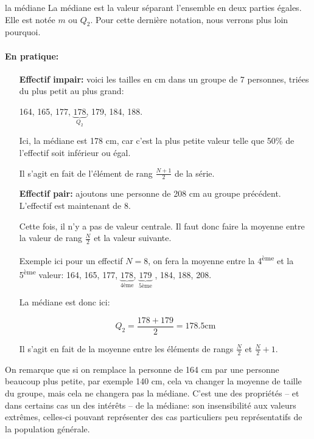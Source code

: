 \documentclass[a4paper,12pt]{scrartcl}
\begin{document}
\begin{definition}{la médiane}
La médiane est la valeur séparant l'ensemble en deux parties égales. Elle est notée $m$ ou $Q_2$. Pour cette dernière notation, nous verrons plus loin pourquoi.
\end{definition}

\paragraph{En pratique:}

\begin{itemize}
 \item[\textbf{Effectif impair:}] voici les tailles en cm dans un groupe de 7 personnes, triées du plus petit au plus grand:

164, 165, 177, $\underbrace{178}_{Q_2}$, 179, 184, 188.

Ici, la médiane est 178 cm, car c'est la plus petite valeur telle que 50\% de l'effectif soit inférieur ou égal.

Il s'agit en fait de l'élément de rang $\frac{N+1}{2}$ de la série.

 \item [\textbf{Effectif pair:}] ajoutons une personne de 208 cm au groupe précédent. L'effectif est maintenant de 8.  
 
 Cette fois, il n'y a pas de valeur centrale. Il faut donc faire la moyenne entre la valeur de rang $\frac{N}{2}$ et la valeur suivante.
 
 Exemple ici pour un effectif $N = 8$, on fera la moyenne entre la 4\textsuperscript{ème} et la 5\textsuperscript{ème} valeur: 
 164, 165, 177, $\underbrace{178}_{\mbox{4ème}}$, $\underbrace{179}_{\mbox{5ème}}$ , 184, 188, 208.
 
 La médiane est donc ici: 
 
 \begin{equation*}
  Q_2 = \frac{178+179}{2} = 178.5 \mbox{cm}
 \end{equation*}

 Il s'agit en fait de la moyenne entre les éléments de rangs $\frac{N}{2}$ et $\frac{N}{2}+1$.

\end{itemize}

On remarque que si on remplace la personne de 164 cm par une personne beaucoup plus petite, par exemple 140 cm, cela va changer la moyenne de taille du groupe, mais cela ne changera pas la médiane. C'est une des propriétés -- et dans certains cas un des intérêts -- de la médiane: son insensibilité aux valeurs extrêmes, celles-ci pouvant représenter des cas particuliers peu représentatifs de la population générale.
\end{document}
